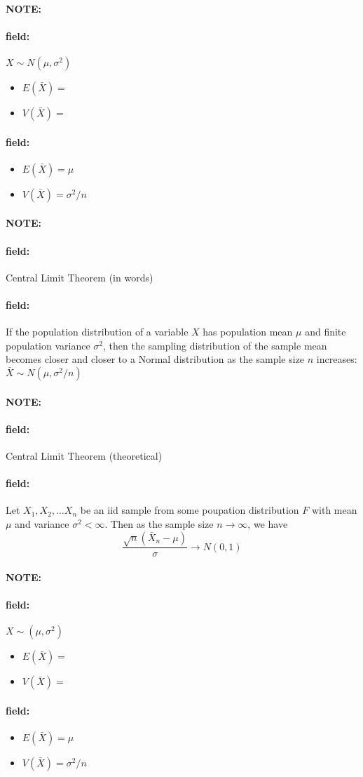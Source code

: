 \documentclass[12pt]{article}
\newenvironment{note}{\paragraph{NOTE:}}{}
\newenvironment{field}{\paragraph{field:}}{}
\begin{document}
\begin{note}
 \begin{field}
  $X \sim N(\mu,\sigma^2)$
  \begin{itemize}
   \item $E(\bar{X}) = $
   \item $V(\bar{X}) = $
  \end{itemize}
 \end{field}
 \begin{field}
  \begin{itemize}
   \item $E(\bar{X}) = \mu$
   \item $V(\bar{X}) = \sigma^2/n$
  \end{itemize}
 \end{field}
\end{note}

\begin{note}
 \begin{field}
  Central Limit Theorem (in words)
 \end{field}
 \begin{field}
  If the population distribution of a variable $X$ has population mean $\mu$ and finite population variance $\sigma^2$, then the sampling distribution of the sample mean becomes closer and closer to a Normal distribution as the sample size $n$ increases: $\bar{X} \sim N(\mu,\sigma^2/n)$
 \end{field}
\end{note}

\begin{note}
 \begin{field}
  Central Limit Theorem (theoretical)
 \end{field}
 \begin{field}
  Let $X_1, X_2, \ldots X_n$ be an iid sample from some poupation distribution $F$ with mean $\mu$ and variance $\sigma^2 < \infty$. Then as the sample size $n \to \infty$, we have $$\frac{\sqrt{n}(\bar{X}_n - \mu)}{\sigma} \to N(0,1)$$
 \end{field}
\end{note}

\begin{note}
 \begin{field}
  $X \sim (\mu,\sigma^2)$
  \begin{itemize}
   \item $E(\bar{X}) = $
   \item $V(\bar{X}) = $
  \end{itemize}
 \end{field}
 \begin{field}
  \begin{itemize}
   \item $E(\bar{X}) = \mu$
   \item $V(\bar{X}) = \sigma^2/n$
  \end{itemize}
 \end{field}
\end{note}
\end{document}
